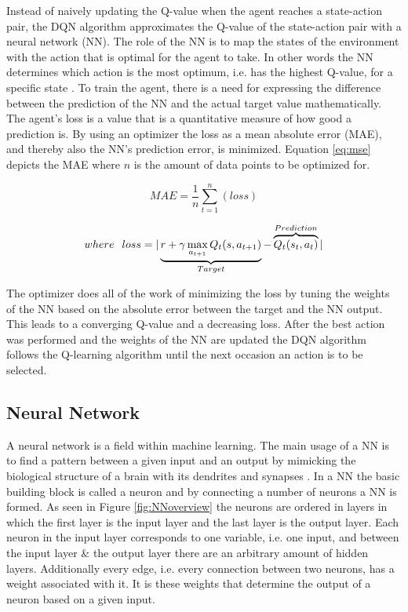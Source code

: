 \noindent Instead of naively updating the Q-value when the agent reaches a state-action pair, the DQN algorithm approximates the Q-value of the state-action pair with a neural network (NN). The role of the NN is to map the states of the environment with the action that is optimal for the agent to take. In other words the NN determines which action is the most optimum, i.e. has the highest Q-value, for a specific state \cite{silver2013DQN}. \newline 
\newline
\noindent To train the agent, there is a need for expressing the difference between the prediction of the NN and the actual target value mathematically. The agent's loss is a value that is a quantitative measure of how good a prediction is. By using an optimizer the loss as a mean absolute error (MAE), and thereby also the NN's prediction error, is minimized. Equation \ref{eq:mse} depicts the MAE where $n$ is the amount of data points to be optimized for.   

\begin{equation}
    \label{eq:mse}
    MAE = \frac{1}{n}\sum^{n}_{t=1}(loss) 
\end{equation}

\begin{equation*}
         where \hspace{0.25cm} loss =  |\underbrace{r + \gamma \max_{a_{t+1}} Q_t(s, a_{t+1})}_{Target} - \overbrace{Q_{t}(s_t,a_t)}^{Prediction}|
\end{equation*}

\noindent The optimizer does all of the work of minimizing the loss by tuning the weights of the NN based on the absolute error between the target and the NN output. This leads to a converging Q-value and a decreasing loss. After the best action was performed and the weights of the NN are updated the DQN algorithm follows the Q-learning algorithm until the next occasion an action is to be selected. 

\subsection{Neural Network}

A neural network is a field within machine learning. The main usage of a NN is to find a pattern between a given input and an output by mimicking the biological structure of a brain with its dendrites and synapses \cite{SiddiqueNH2013Ciso}. In a NN the basic building block is called a neuron and by connecting a number of neurons a NN is formed. As seen in Figure \ref{fig:NNoverview} the neurons are ordered in layers in which the first layer is the input layer and the last layer is the output layer. Each neuron in the input layer corresponds to one variable, i.e. one input, and between the input layer \& the output layer there are an arbitrary amount of hidden layers. Additionally every edge, i.e. every connection between two neurons, has a weight associated with it. It is these weights that determine the output of a neuron based on a given input. \newline       

